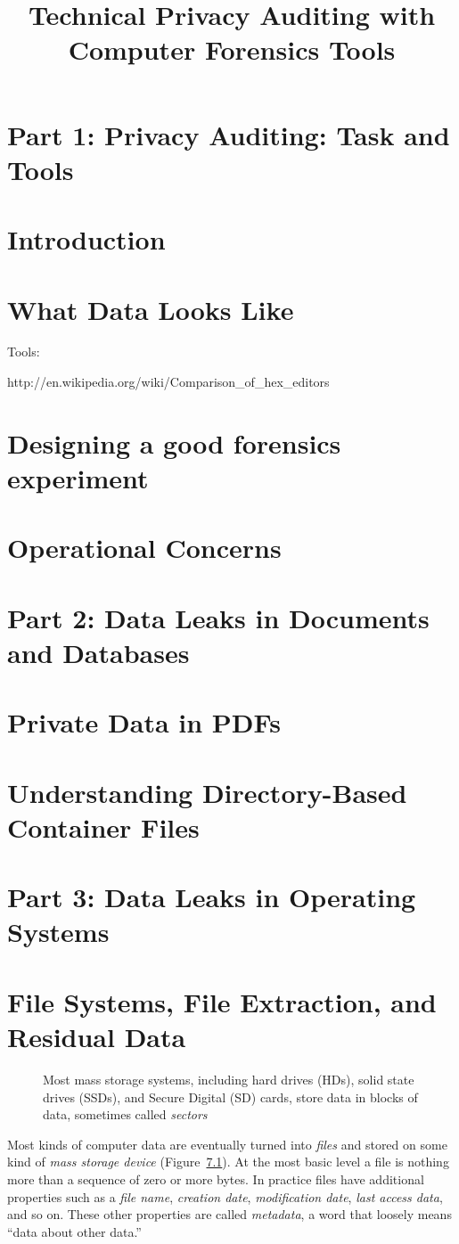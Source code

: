 \documentclass[11pt,letter]{book}
\newcommand{\figref}[1]{Figure~\ref{#1}\xspace}
\newcommand{\sgraphic}[3][width=\linewidth]{
  \begin{figure}
  \begin{center}
  \fbox{\texttt{[image: \#2]}}
  \end{center}
  \caption{#3\label{#2}}
  \end{figure}
}
\begin{document}
\title{Technical Privacy Auditing with Computer Forensics Tools}
\chapter*{Part 1: Privacy Auditing: Task and Tools}
\chapter{Introduction}
\chapter{What Data Looks Like}

Tools:

http://en.wikipedia.org/wiki/Comparison_of_hex_editors

\chapter{Designing a good forensics experiment}
\chapter{Operational Concerns}
\chapter*{Part 2: Data Leaks in Documents and Databases}
\chapter{Private Data in PDFs}
\chapter{Understanding Directory-Based Container Files}
\chapter*{Part 3: Data Leaks in Operating Systems}
\chapter{File Systems, File Extraction, and Residual Data}
\sgraphic{art/TK}{Most mass storage systems, including hard drives (HDs),
  solid state drives (SSDs), and Secure Digital (SD) cards, store data
  in blocks of data, sometimes called \emph{sectors}}

Most kinds of computer data are eventually turned into \emph{files}
and stored on some kind of
\emph{mass storage device} (\figref{art/TK}). At the most basic level a file is
nothing more than a sequence of zero or more bytes. In practice files
have additional properties such as a \emph{file name}, 
\emph{creation date}, \emph{modification date}, \emph{last access
  data}, and so on. These other properties are called \emph{metadata},
a word that loosely means ``data about other data.''
\end{document}

